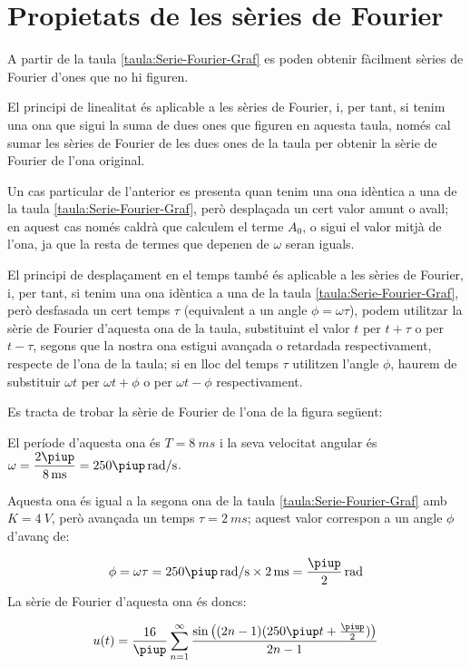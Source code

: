 \section{Propietats de les sèries de Fourier}

A partir de la taula \vref{taula:Serie-Fourier-Graf} es poden obtenir fàcilment sèries de Fourier d'ones que no hi figuren.

El principi de linealitat és aplicable a les sèries de Fourier, i, per tant, si tenim una ona que sigui la suma de dues ones que figuren en aquesta taula, només  cal sumar les sèries de Fourier de les dues ones de la taula per obtenir la sèrie de Fourier de l'ona original.

Un cas particular de l'anterior es presenta quan tenim una ona  idèntica a una de la taula \ref{taula:Serie-Fourier-Graf}, però desplaçada un cert valor amunt o avall; en aquest cas només caldrà que calculem el terme $A_0$, o sigui el valor mitjà de l'ona, ja que la resta de termes que depenen de $\omega$ seran iguals.

El principi de desplaçament en el temps també és aplicable a les sèries de Fourier, i, per tant, si tenim una ona idèntica a una de la taula \ref{taula:Serie-Fourier-Graf}, però desfasada un cert temps $\tau$ (equivalent a un angle $\phi = \omega \tau$), podem utilitzar la sèrie de Fourier d'aquesta ona de la taula, substituint el valor $t$ per $t+\tau$ o per $t-\tau$, segons que la nostra ona estigui avançada o retardada respectivament, respecte de l'ona de la taula; si en lloc del temps $\tau$ utilitzen l'angle $\phi$, haurem de substituir  $\omega t$ per $\omega t + \phi$ o per $\omega t - \phi$ respectivament.


\begin{exemple}[\SerieFouTaulaFormes{}]
	\addcontentsxms{\SerieFouTaulaFormes}
    Es tracta de trobar la sèrie de Fourier de l'ona de la figura següent:
    \begin{center}
        
    \end{center}

    El període d'aquesta ona és $T=\qty{8}{ms}$ i la seva velocitat angular és $\omega = \dfrac{2\piup}{\qty{8}{ms}} = 250 \piup\unit{\,rad/s}$.

    Aquesta ona és igual a la segona ona de la taula \vref{taula:Serie-Fourier-Graf} amb $K=\qty{4}{V}$, però avançada un temps $\tau=\qty{2}{ms}$; aquest valor correspon a un angle $\phi$ d'avanç de:

    \[
        \phi = \omega \tau = 250\piup\unit{\,rad/s} \times \qty{2}{ms} = \frac{\piup}{2}\unit{\,rad}
    \]
    La sèrie de Fourier d'aquesta ona és doncs:

    \[
    u(t) = \frac{{16}}{\piup }\sum\limits_{n = 1}^\infty  {\frac{{\sin \big((2n - 1)(250\piup t+ \frac{\piup}{2})\big)}}{{2n - 1}}}
    \]
\end{exemple}


